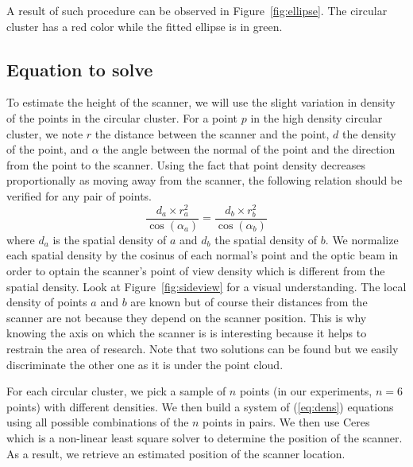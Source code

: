 A result of such procedure can be observed in Figure~\ref{fig:ellipse}. The circular cluster has a red color while the fitted ellipse is in green.


\subsection{Equation to solve}
\label{subsc:ellipse-eq}
To estimate the height of the scanner, we will use the slight variation in density of the points in the circular cluster.
For a point $p$ in the high density circular cluster, we note $r$ the distance between the scanner and the point, $d$ the density of the point, and $\alpha$ the angle between the normal of the point and the direction
from the point to the scanner. Using the fact that point density decreases proportionally as moving away from the scanner, the following relation should be verified for any pair of points.
\begin{equation}
\frac{d_a \times r_a^2}{\cos(\alpha_a)} = \frac{d_b \times r_b^2}{\cos(\alpha_b)}
\label{eq:dens}
\end{equation}
where $d_a$ is the spatial density of $a$ and $d_b$ the spatial density of $b$. We normalize each spatial density by the cosinus of each normal's point and the optic beam in order to optain the scanner's point of view density which is different from the spatial density. Look at Figure~\ref{fig:sideview} for a visual understanding. The local density of points $a$ and $b$ are known but of course their distances from the scanner are not because they depend on the scanner position. This is why knowing the axis on which the scanner is is interesting because it helps to restrain the area of research. Note that two solutions can be found but we easily discriminate the other one as it is under the point cloud.

For each circular cluster, we pick a sample of $n$ points (in our experiments, $n=6$ points) with different densities. We then build a system of (\ref{eq:dens}) equations using all possible combinations of the $n$ points in pairs. We then use Ceres~\cite{ceres} which is a non-linear least square solver to determine the position of the scanner. As a result, we retrieve an estimated position of the scanner location.

